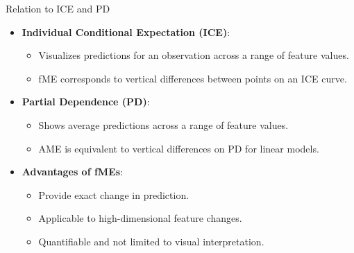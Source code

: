 \documentclass[10pt,compress,t,notes=noshow, xcolor=table]{beamer}
\begin{document}




\begin{frame}{Relation to ICE and PD}
\begin{itemize}
\item \textbf{Individual Conditional Expectation (ICE)}:
\begin{itemize}
\item Visualizes predictions for an observation across a range of feature values.
\item fME corresponds to vertical differences between points on an ICE curve.
\end{itemize}
\item \textbf{Partial Dependence (PD)}:
\begin{itemize}
\item Shows average predictions across a range of feature values.
\item AME is equivalent to vertical differences on PD for linear models.
\end{itemize}
\item \textbf{Advantages of fMEs}:
\begin{itemize}
\item Provide exact change in prediction.
\item Applicable to high-dimensional feature changes.
\item Quantifiable and not limited to visual interpretation.
\end{itemize}
\end{itemize}
\end{frame}
\end{document}

